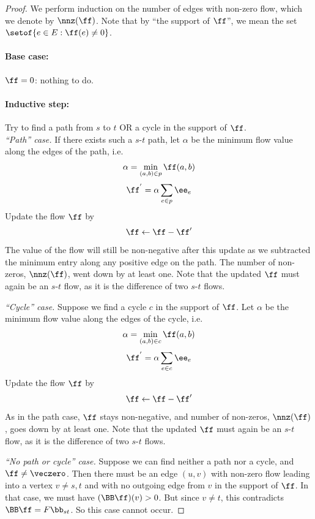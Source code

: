 \begin{proof}
We perform induction on the number of edges with non-zero flow, which
we denote by $\nnz(\ff)$.
Note that by ``the support of $\ff$'', we mean the set $\setof{e \in E :
  \ff(e) \neq 0}$.
\paragraph{Base case:}  \(\ff = 0\): nothing to do.
\paragraph{Inductive step:}
Try to find a path from \(s\) to \(t\) OR a cycle in the support of \(\ff\). \\
\emph{``Path'' case.}
If there exists such a $s$-$t$ path, let \(\alpha\) be the minimum flow value along the edges of the path, i.e.
\begin{equation} \nonumber
\begin{aligned}
\alpha = \min_{(a,b) \in p} \ff(a,b)
\end{aligned}
\end{equation}
\begin{equation} \nonumber
    \ff^{'} = \alpha \sum_{e \in p} \ee_e
\end{equation}
Update the flow $\ff$ by
\begin{equation} \nonumber
    \ff  \leftarrow \ff - \ff'
\end{equation}
The value of the flow will still be non-negative after this update as we
subtracted the minimum entry along any positive edge on the path. The
number of non-zeros, $\nnz(\ff)$, went down by at least one.
Note that the updated $\ff$ must again be an $s$-$t$ flow, as it is the
difference of two $s$-$t$ flows.

\emph{``Cycle'' case.}
Suppose we find a cycle \(c\) in the support of \(\ff\).
Let \(\alpha\) be the minimum flow value along the edges of the cycle, i.e.\
\begin{equation*}
\alpha = \min_{(a,b) \in c} \ff(a,b)
\end{equation*}
\begin{equation*}
 \ff^{'} = \alpha \sum_{e \in c} \ee_e
\end{equation*}
Update the flow $\ff$ by
\begin{equation} \nonumber
    \ff  \leftarrow \ff - \ff'
  \end{equation}
  As in the path case, $\ff$ stays non-negative, and
number of non-zeros, $\nnz(\ff)$, goes down by at least one.
Note that the updated $\ff$ must again be an $s$-$t$ flow, as it is the
difference of two $s$-$t$ flows.

\emph{``No path or cycle'' case.}
Suppose we can find neither a path nor a cycle, and $\ff \neq
\veczero$.
Then there must be an edge $(u,v)$ with non-zero flow leading into a
vertex $v \neq s,t$ and with no outgoing edge from
$v$ in the support of $\ff$.
In that case, we must have $(\BB\ff)(v) > 0$.
But since $v \neq t$, this contradicts $\BB \ff = F \bb_{st} $.
So this case cannot occur.
\end{proof}
